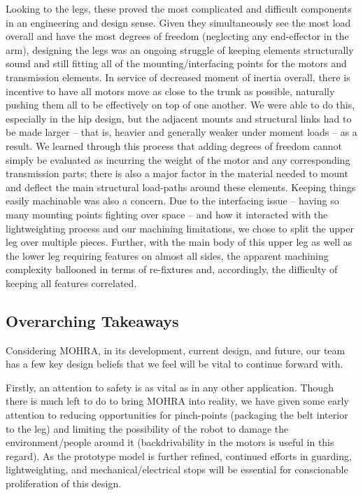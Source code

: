 \documentclass{article}
\begin{document}
Looking to the legs, these proved the most complicated and difficult components in an engineering and design sense. Given they simultaneously see the most load overall and have the most degrees of freedom (neglecting any end-effector in the arm), designing the legs was an ongoing struggle of keeping elements structurally sound and still fitting all of the mounting/interfacing points for the motors and transmission elements. In service of decreased moment of inertia overall, there is incentive to have all motors move as close to the trunk as possible, naturally pushing them all to be effectively on top of one another. We were able to do this, especially in the hip design, but the adjacent mounts and structural links had to be made larger -- that is, heavier and generally weaker under moment loads -- as a result. We learned through this process that adding degrees of freedom cannot simply be evaluated as incurring the weight of the motor and any corresponding transmission parts; there is also a major factor in the material needed to mount and deflect the main structural load-paths around these elements. Keeping things easily machinable was also a concern. Due to the interfacing issue -- having so many mounting points fighting over space -- and how it interacted with the lightweighting process and our machining limitations, we chose to split the upper leg over multiple pieces. Further, with the main body of this upper leg as well as the lower leg requiring features on almost all sides, the apparent machining complexity ballooned in terms of re-fixtures and, accordingly, the difficulty of keeping all features correlated.

\subsection{Overarching Takeaways}

Considering MOHRA, in its development, current design, and future, our team has a few key design beliefs that we feel will be vital to continue forward with. 

Firstly, an attention to safety is as vital as in any other application. Though there is much left to do to bring MOHRA into reality, we have given some early attention to reducing opportunities for pinch-points (packaging the belt interior to the leg) and limiting the possibility of the robot to damage the environment/people around it (backdrivability in the motors is useful in this regard). As the prototype model is further refined, continued efforts in guarding, lightweighting, and mechanical/electrical stops will be essential for conscionable proliferation of this design. 
\end{document}
